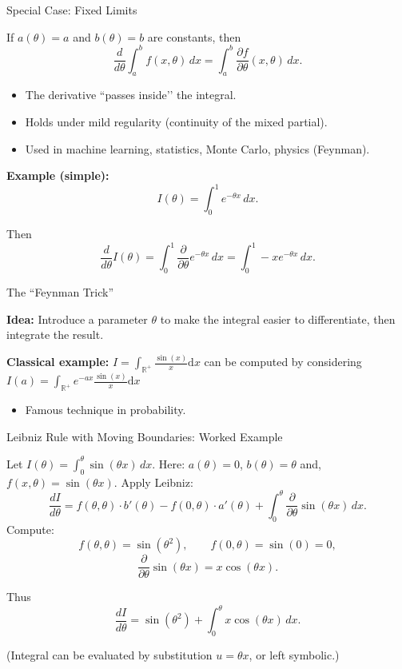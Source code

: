 \documentclass[aspectratio=169]{beamer}
\newcommand{\R}{\mathbb{R}}
\begin{document}
\begin{frame}{Special Case: Fixed Limits}

If \(a(\theta)=a\) and \(b(\theta)=b\) are constants, then
\[
\frac{d}{d\theta} \int_a^b f(x,\theta)\,dx
=
\int_a^b \frac{\partial f}{\partial \theta}(x,\theta)\,dx.
\]

\begin{itemize}
    \item The derivative “passes inside’’ the integral.
    \item Holds under mild regularity (continuity of the mixed partial).
    \item Used in machine learning, statistics, Monte Carlo, physics (Feynman).
\end{itemize}

\medskip

\textbf{Example (simple):}
\[
I(\theta)=\int_0^1 e^{-\theta x}\,dx.
\]

Then
\[
\frac{d}{d\theta}I(\theta)
=
\int_0^1 \frac{\partial}{\partial \theta}e^{-\theta x}\,dx
=
\int_0^1 -x e^{-\theta x}\,dx.
\]

\end{frame}

\begin{frame}{The “Feynman Trick”}

\textbf{Idea:}  
Introduce a parameter \(\theta\) to make the integral easier to differentiate,  
then integrate the result.

\medskip
\textbf{Classical example:}
$I = \int_{\R^+} \frac{\sin(x)}{x} \mathrm{d}x$ can be computed by considering $I(a) =  \int_{\R^+} e^{-ax}\frac{\sin(x)}{x} \mathrm{d}x$
\begin{itemize}
    \item Famous technique in probability.
\end{itemize}

\end{frame}

\begin{frame}{Leibniz Rule with Moving Boundaries: Worked Example}

Let
$
I(\theta)=\int_0^{\theta} \sin(\theta x)\,dx.
$
Here:
$
a(\theta)=0$, $b(\theta)=\theta$ and, $f(x,\theta)=\sin(\theta x).
$
Apply Leibniz:
\[
\frac{dI}{d\theta}
=
f(\theta,\theta)\cdot b'(\theta)
-
f(0,\theta)\cdot a'(\theta)
+
\int_{0}^{\theta}
\frac{\partial}{\partial \theta}\sin(\theta x)\,dx.
\]
Compute:
\[
f(\theta,\theta)=\sin(\theta^2), \qquad
f(0,\theta)=\sin(0)=0,
\]
\[
\frac{\partial}{\partial \theta}\sin(\theta x)=x\cos(\theta x).
\]

Thus
\[
\frac{dI}{d\theta}
=
\sin(\theta^2)
+
\int_{0}^{\theta} x\cos(\theta x)\,dx.
\]

(Integral can be evaluated by substitution \(u=\theta x\), or left symbolic.)

\end{frame}
\end{document}
